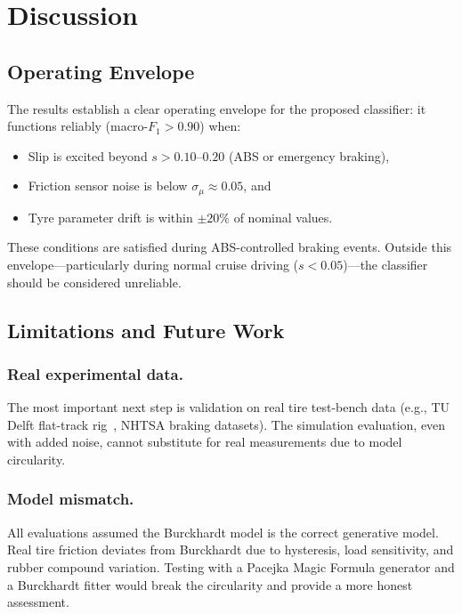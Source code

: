 \documentclass[11pt,a4paper]{article}
\begin{document}
\section{Discussion}
\label{sec:discussion}

\subsection{Operating Envelope}

The results establish a clear operating envelope for the proposed classifier:
it functions reliably (macro-$F_1 > 0.90$) when:
\begin{itemize}
  \item Slip is excited beyond $s > 0.10$--$0.20$ (ABS or emergency braking),
  \item Friction sensor noise is below $\sigma_\mu \approx 0.05$, and
  \item Tyre parameter drift is within $\pm 20\%$ of nominal values.
\end{itemize}
These conditions are satisfied during ABS-controlled braking events.
Outside this envelope---particularly during normal cruise driving
($s < 0.05$)---the classifier should be considered unreliable.

\subsection{Limitations and Future Work}

\subsubsection{Real experimental data.}
The most important next step is validation on real tire test-bench data
(e.g., TU Delft flat-track rig~\cite{besselink2010}, NHTSA braking datasets).
The simulation evaluation, even with added noise, cannot substitute for
real measurements due to model circularity.

\subsubsection{Model mismatch.}
All evaluations assumed the Burckhardt model is the correct generative model.
Real tire friction deviates from Burckhardt due to hysteresis,
load sensitivity, and rubber compound variation.
Testing with a Pacejka Magic Formula generator and a Burckhardt
fitter would break the circularity and provide a more honest assessment.
\end{document}
